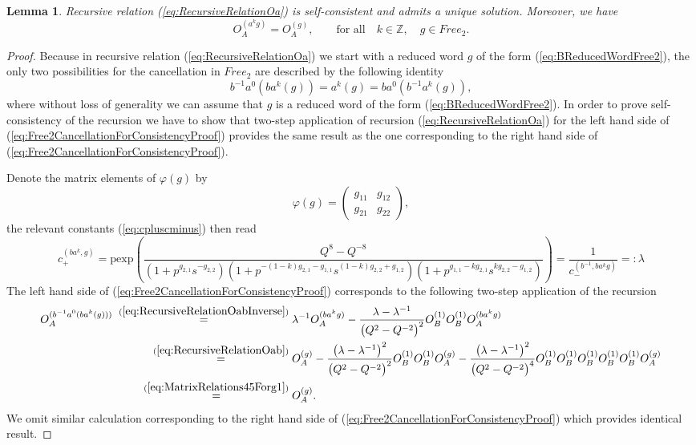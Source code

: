 \documentclass{amsart}
\newtheorem{lemma}[theorem]{Lemma}
\begin{document}
\begin{lemma}
Recursive relation (\ref{eq:RecursiveRelationOa}) is self-consistent and admits a unique solution. Moreover, we have
\begin{equation}
O_A^{(a^kg)}=O_A^{(g)},\qquad\textrm{for all}\quad k\in\mathbb Z,\quad g\in Free_2.
\label{eq:MatrixOaLeftInvariance}
\end{equation}
\end{lemma}
\begin{proof}
Because in recursive relation (\ref{eq:RecursiveRelationOa}) we start with a reduced word $g$ of the form (\ref{eq:BReducedWordFree2}), the only two possibilities for the cancellation in $Free_2$ are described by the following identity
\begin{equation}
b^{-1}a^0(ba^k(g))=a^k(g)=ba^{0}(b^{-1}a^k(g)),
\label{eq:Free2CancellationForConsistencyProof}
\end{equation}
where without loss of generality we can assume that $g$ is a reduced word of the form (\ref{eq:BReducedWordFree2}). In order to prove self-consistency of the recursion we have to show that two-step application of recursion (\ref{eq:RecursiveRelationOa}) for the left hand side of (\ref{eq:Free2CancellationForConsistencyProof}) provides the same result as the one corresponding to the right hand side of (\ref{eq:Free2CancellationForConsistencyProof}).

Denote the matrix elements of $\varphi(g)$ by
\begin{equation*}
\varphi(g)=\left(\begin{array}{cc}
g_{11}&g_{12}\\
g_{21}&g_{22}
\end{array}\right),
\end{equation*}
the relevant constants (\ref{eq:cpluscminus}) then read
\begin{equation}
c_+^{(ba^k,g)}=\mathrm{pexp}\left(\frac{Q^8-Q^{-8}}{\left(1+p^{g_{2,1}} s^{-g_{2,2}}\right) \left(1+p^{-(1-k) g_{2,1}-g_{1,1}} s^{(1-k) g_{2,2}+g_{1,2}}\right) \left(1+p^{g_{1,1}-k g_{2,1}} s^{k g_{2,2}-g_{1,2}}\right)}\right)=\frac1{c_-^{(b^{-1},ba^kg)}}=:\lambda
\label{eq:cpRelevantFirstArgumentExplicitFormula}
\end{equation}
The left hand side of (\ref{eq:Free2CancellationForConsistencyProof}) corresponds to the following two-step application of the recursion
\begin{align*}
O_A^{(b^{-1}a^0(ba^{k}(g)))}\;\overset{(\ref{eq:RecursiveRelationOabInverse})}{=}&\;\lambda^{-1}O_A^{(ba^kg)}-\frac{\lambda-\lambda^{-1}}{\big(Q^2-Q^{-2}\big)^2}O_B^{(1)}O_B^{(1)}O_A^{(ba^kg)}\\
\overset{(\ref{eq:RecursiveRelationOab})}{=}&\;O_A^{(g)}-\frac{\left(\lambda-\lambda^{-1}\right)^2}{\big(Q^2-Q^{-2}\big)^2}O_B^{(1)}O_B^{(1)}O_A^{(g)}-\frac{\left(\lambda-\lambda^{-1}\right)^2}{\big(Q^2-Q^{-2}\big)^4}O_B^{(1)}O_B^{(1)}O_B^{(1)}O_B^{(1)}O_B^{(1)}O_A^{(g)}\\
\overset{(\ref{eq:MatrixRelations45Forg1})}{=}&\;O_A^{(g)}.
\end{align*}
We omit similar calculation corresponding to the right hand side of (\ref{eq:Free2CancellationForConsistencyProof}) which provides identical result.


\end{proof}
\end{document}
